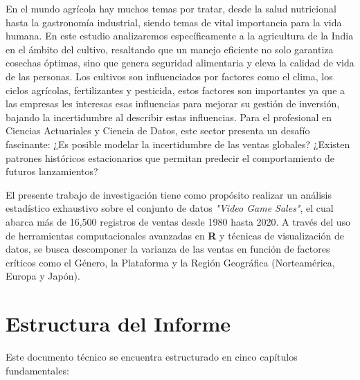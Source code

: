 \documentclass[oneside,11pt]{Latex/Classes/PhDthesisPSnPDF}
\begin{document}
En el mundo agrícola hay muchos temas por tratar, desde la salud
nutricional hasta la gastronomía industrial, siendo temas de vital
importancia para la vida humana. En este estudio analizaremos
específicamente a la agricultura de la India en el ámbito del cultivo,
resaltando que un manejo eficiente no solo garantiza cosechas óptimas,
sino que genera seguridad alimentaria y eleva la calidad de vida de las
personas. Los cultivos son influenciados por factores como el clima, los
ciclos agrícolas, fertilizantes y pesticida, estos factores son
importantes ya que a las empresas les interesas esas influencias para
mejorar su gestión de inversión, bajando la incertidumbre al describir
estas influencias. Para el profesional en Ciencias Actuariales y Ciencia
de Datos, este sector presenta un desafío fascinante: ¿Es posible
modelar la incertidumbre de las ventas globales? ¿Existen patrones
históricos estacionarios que permitan predecir el comportamiento de
futuros lanzamientos?

El presente trabajo de investigación tiene como propósito realizar un
análisis estadístico exhaustivo sobre el conjunto de datos
\textit{"Video Game Sales"}, el cual abarca más de 16,500 registros de
ventas desde 1980 hasta 2020. A través del uso de herramientas
computacionales avanzadas en \textbf{R} y técnicas de visualización de
datos, se busca descomponer la varianza de las ventas en función de
factores críticos como el Género, la Plataforma y la Región Geográfica
(Norteamérica, Europa y Japón).

\section*{Estructura del Informe}

Este documento técnico se encuentra estructurado en cinco capítulos
fundamentales:
\end{document}
